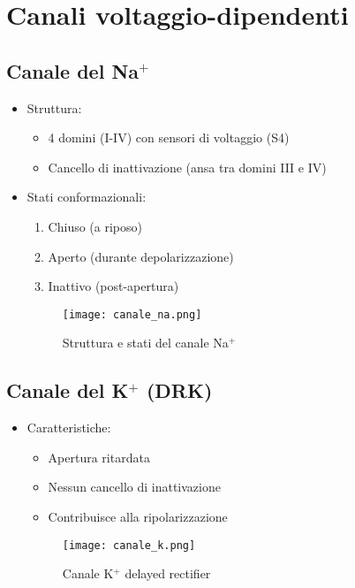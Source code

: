 \documentclass{article}
\begin{document}
\section{Canali voltaggio-dipendenti}
\subsection{Canale del Na\(^+\)}
\begin{itemize}
\item Struttura:
  \begin{itemize}
  \item 4 domini (I-IV) con sensori di voltaggio (S4)
  \item Cancello di inattivazione (ansa tra domini III e IV)
  \end{itemize}

\item Stati conformazionali:
  \begin{enumerate}
  \item Chiuso (a riposo)
  \item Aperto (durante depolarizzazione)
  \item Inattivo (post-apertura)
  \end{enumerate}

\begin{figure}[h]
\centering
\texttt{[image: canale\_na.png]}
\caption{Struttura e stati del canale Na\(^+\)}
\label{fig:canale_na}
\end{figure}
\end{itemize}

\subsection{Canale del K\(^+\) (DRK)}
\begin{itemize}
\item Caratteristiche:
  \begin{itemize}
  \item Apertura ritardata
  \item Nessun cancello di inattivazione
  \item Contribuisce alla ripolarizzazione
  \end{itemize}

\begin{figure}[h]
\centering
\texttt{[image: canale\_k.png]}
\caption{Canale K\(^+\) delayed rectifier}
\label{fig:canale_k}
\end{figure}
\end{itemize}
\end{document}
